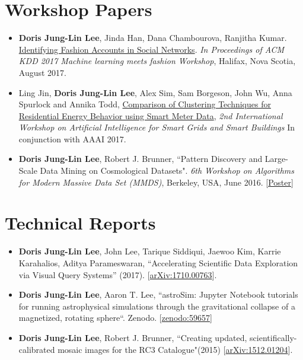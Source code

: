 \documentclass{res}
\begin{document}
\begin{resume}
\section{Workshop Papers}
\begin{itemize}
\item \textbf{Doris Jung-Lin Lee}, Jinda Han, Dana Chambourova, Ranjitha Kumar. \href{https://kddfashion2017.mybluemix.net/final_submissions/ML4Fashion_paper_21.pdf}{Identifying Fashion Accounts in Social Networks}.  \textit{In Proceedings of ACM KDD 2017 Machine learning meets fashion Workshop}, Halifax, Nova Scotia, August 2017.
\item Ling Jin, \textbf{Doris Jung-Lin Lee}, Alex Sim, Sam Borgeson, John Wu, Anna Spurlock and Annika Todd, \href{https://sdm.lbl.gov/perf/AISGSB2017-final2.pdf}{Comparison of Clustering Techniques for Residential Energy Behavior using Smart Meter Data}, \textit{2nd International Workshop on Artificial Intelligence for Smart Grids and Smart Buildings} In conjunction with AAAI 2017.
\item \textbf{Doris Jung-Lin Lee}, Robert J. Brunner, ``Pattern Discovery and Large-Scale Data Mining on Cosmological Datasets". \textit{6th Workshop on Algorithms for Modern Massive Data Set (MMDS)}, Berkeley, USA, June 2016.  [\href{http://dorisjunglinlee.com/files/MMDS_poster.pdf}{Poster}]
\end{itemize}
\vspace{-10pt}
\section{Technical Reports}
\begin{itemize}
\item \textbf{Doris Jung-Lin Lee}, John Lee, Tarique Siddiqui, Jaewoo Kim, Karrie Karahalios, Aditya Parameswaran, ``Accelerating Scientific Data Exploration via Visual Query Systems'' (2017). [\href{https://arxiv.org/abs/1710.00763}{arXiv:1710.00763}].  
\item \textbf{Doris Jung-Lin Lee}, Aaron T. Lee, ``astroSim: Jupyter Notebook tutorials for running astrophysical simulations through the gravitational collapse of a magnetized, rotating sphere``. Zenodo. [\href{http://doi.org/10.5281/zenodo.59657}{zenodo:59657}]
\item \textbf{Doris Jung-Lin Lee}, Robert J. Brunner, ``Creating updated, scientifically-calibrated mosaic images for the RC3 Catalogue"(2015) [\href{http://arxiv.org/abs/1512.01204}{arXiv:1512.01204}]. 
\end{itemize}

\end{resume}
\end{document}

